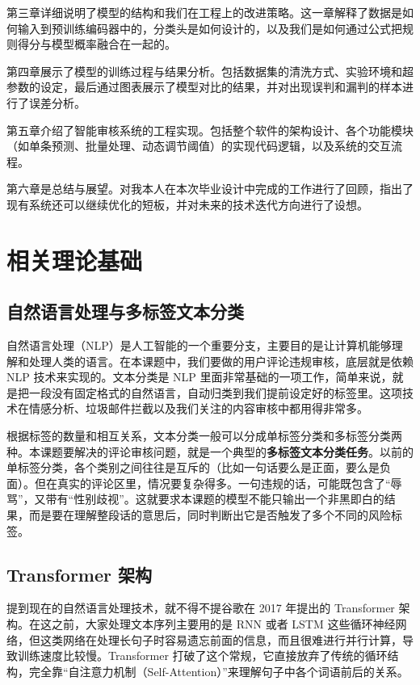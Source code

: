 \documentclass[twoside]{thesis-cls-Miya} %
\begin{document}
第三章详细说明了模型的结构和我们在工程上的改进策略。这一章解释了数据是如何输入到预训练编码器中的，分类头是如何设计的，以及我们是如何通过公式把规则得分与模型概率融合在一起的。

第四章展示了模型的训练过程与结果分析。包括数据集的清洗方式、实验环境和超参数的设定，最后通过图表展示了模型对比的结果，并对出现误判和漏判的样本进行了误差分析。

第五章介绍了智能审核系统的工程实现。包括整个软件的架构设计、各个功能模块（如单条预测、批量处理、动态调节阈值）的实现代码逻辑，以及系统的交互流程。

第六章是总结与展望。对我本人在本次毕业设计中完成的工作进行了回顾，指出了现有系统还可以继续优化的短板，并对未来的技术迭代方向进行了设想。


\chapter{相关理论基础}

\section{自然语言处理与多标签文本分类}

自然语言处理（NLP）是人工智能的一个重要分支，主要目的是让计算机能够理解和处理人类的语言。在本课题中，我们要做的用户评论违规审核，底层就是依赖 NLP 技术来实现的。文本分类是 NLP 里面非常基础的一项工作，简单来说，就是把一段没有固定格式的自然语言，自动归类到我们提前设定好的标签里。这项技术在情感分析、垃圾邮件拦截以及我们关注的内容审核中都用得非常多。

根据标签的数量和相互关系，文本分类一般可以分成单标签分类和多标签分类两种。本课题要解决的评论审核问题，就是一个典型的\textbf{多标签文本分类任务}。以前的单标签分类，各个类别之间往往是互斥的（比如一句话要么是正面，要么是负面）。但在真实的评论区里，情况要复杂得多。一句违规的话，可能既包含了“辱骂”，又带有“性别歧视”。这就要求本课题的模型不能只输出一个非黑即白的结果，而是要在理解整段话的意思后，同时判断出它是否触发了多个不同的风险标签。

\section{Transformer 架构}
提到现在的自然语言处理技术，就不得不提谷歌在 2017 年提出的 Transformer 架构。在这之前，大家处理文本序列主要用的是 RNN 或者 LSTM 这些循环神经网络，但这类网络在处理长句子时容易遗忘前面的信息，而且很难进行并行计算，导致训练速度比较慢。Transformer 打破了这个常规，它直接放弃了传统的循环结构，完全靠“自注意力机制（Self-Attention）”来理解句子中各个词语前后的关系。
\end{document}
